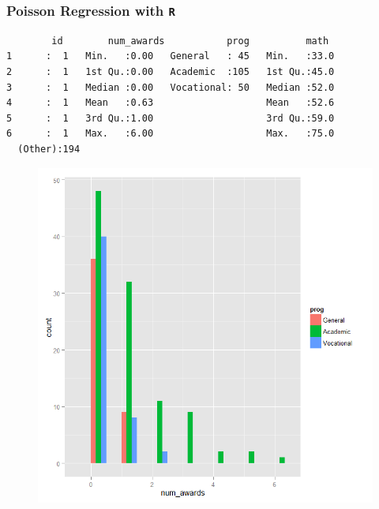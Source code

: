 \documentclass[MASTER.tex]{subfiles}
\begin{document}
%
%

\begin{frame}[fragile]
	
\frametitle{Poisson Regression with \texttt{R}}
\normalsize
	\begin{verbatim}
        id        num_awards           prog          math     
1      :  1   Min.   :0.00   General   : 45   Min.   :33.0  
2      :  1   1st Qu.:0.00   Academic  :105   1st Qu.:45.0  
3      :  1   Median :0.00   Vocational: 50   Median :52.0  
4      :  1   Mean   :0.63                    Mean   :52.6  
5      :  1   3rd Qu.:1.00                    3rd Qu.:59.0  
6      :  1   Max.   :6.00                    Max.   :75.0  
  (Other):194
\end{verbatim}
\end{frame}
\begin{frame}
	\begin{figure}
		\centering
		\includegraphics[width=0.8\linewidth]{poisson1}
		\caption{}
		\label{fig:poisson1}
	\end{figure}
	
	
\end{frame}
\end{document}
